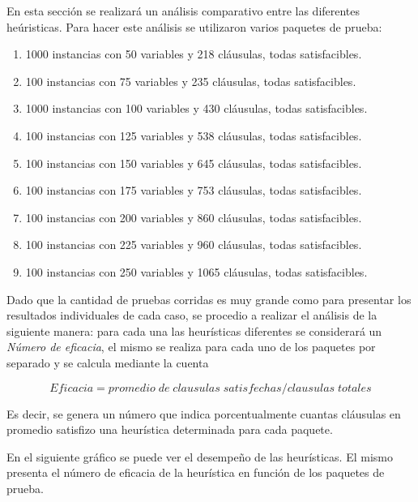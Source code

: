 \documentclass[a4paper,10pt]{article}
\begin{document}
En esta secci\'on se realizar\'a un an\'alisis comparativo entre las diferentes he\'uristicas. Para hacer este an\'alisis se utilizaron varios paquetes de prueba:

\begin{enumerate}
\item 1000 instancias con 50 variables y 218 cl\'ausulas, todas satisfacibles.
\item 100 instancias con 75 variables y 235 cl\'ausulas, todas satisfacibles.
\item 1000 instancias con 100 variables y 430 cl\'ausulas, todas satisfacibles.
\item 100 instancias con 125 variables y 538 cl\'ausulas, todas satisfacibles.
\item 100 instancias con 150 variables y 645 cl\'ausulas, todas satisfacibles.
\item 100 instancias con 175 variables y 753 cl\'ausulas, todas satisfacibles.
\item 100 instancias con 200 variables y 860 cl\'ausulas, todas satisfacibles.
\item 100 instancias con 225 variables y 960 cl\'ausulas, todas satisfacibles.
\item 100 instancias con 250 variables y 1065 cl\'ausulas, todas satisfacibles.
\end{enumerate}

Dado que la cantidad de pruebas corridas es muy grande como para presentar los resultados individuales de cada caso, se procedio a realizar el an\'alisis de la siguiente manera: para cada una las heur\'isticas diferentes se considerar\'a un \emph{N\'umero de eficacia}, el mismo se realiza para cada uno de los paquetes por separado y se calcula mediante la cuenta 

\begin{equation}
Eficacia = promedio\;de\;clausulas\;satisfechas/clausulas\;totales
\end{equation}

Es decir, se genera un n\'umero que indica porcentualmente cuantas cl\'ausulas en promedio satisfizo una heur\'istica determinada para cada paquete.

En el siguiente gr\'afico se puede ver el desempe\~{n}o de las heur\'isticas. El mismo presenta el n\'umero de eficacia de la heur\'istica en funci\'on de los paquetes de prueba.
\end{document}
